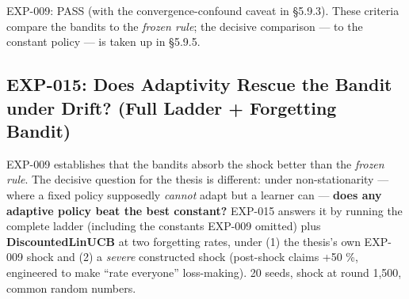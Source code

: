 EXP-009: PASS (with the convergence-confound caveat in §5.9.3). These criteria compare the bandits to the \emph{frozen rule}; the decisive comparison --- to the constant policy --- is taken up in §5.9.5.

\subsection{EXP-015: Does Adaptivity Rescue the Bandit under Drift? (Full Ladder + Forgetting Bandit)}\label{exp-015-does-adaptivity-rescue-the-bandit-under-drift-full-ladder-forgetting-bandit}

EXP-009 establishes that the bandits absorb the shock better than the \emph{frozen rule}. The decisive question for the thesis is different: under non-stationarity --- where a fixed policy supposedly \emph{cannot} adapt but a learner can --- \textbf{does any adaptive policy beat the best constant?} EXP-015 answers it by running the complete ladder (including the constants EXP-009 omitted) plus \textbf{DiscountedLinUCB} at two forgetting rates, under (1) the thesis's own EXP-009 shock and (2) a \emph{severe} constructed shock (post-shock claims +50 \%, engineered to make ``rate everyone'' loss-making). 20 seeds, shock at round 1,500, common random numbers.

\label{tab:5.9.2}

